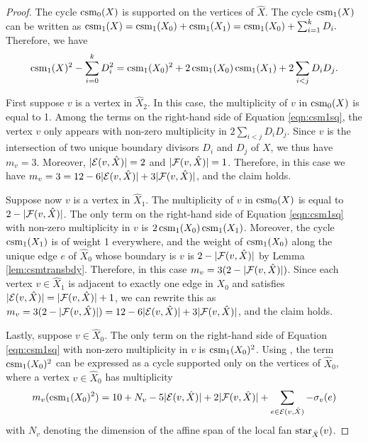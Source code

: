 \begin{proof}
The cycle $\operatorname{csm}_0(X)$ is supported on the vertices of $\hat{X}$. 
The cycle $\operatorname{csm}_1(X)$ can be written as 
$\operatorname{csm}_1(X) = \operatorname{csm}_1(X_0) + \operatorname{csm}_1(X_1) = \operatorname{csm}_1(X_0) + \sum_{i=1}^k D_i.$ 
Therefore, we have 
\begin{equation}\label{eqn:csm1sq}
\operatorname{csm}_1(X)^2 -  \sum_{i=0}^k D_i^2 = \operatorname{csm}_1(X_0)^2 + 2 \operatorname{csm}_1(X_0) \operatorname{csm}_1(X_1)  + 2\sum_{i < j} D_i D_j. 
\end{equation}

First suppose $v$ is a vertex in $\hat{X}_2$. 
In this case, the multiplicity of $v$ in $\operatorname{csm}_0(X)$ is equal to 1. 
Among the terms on the right-hand side of Equation \eqref{eqn:csm1sq}, the vertex  $v$ only appears with non-zero multiplicity in $2\sum_{i < j} D_i D_j$. Since $v$ is the intersection of two unique boundary divisors $D_i$ and $D_j$ of $X$, we thus have 
$m_v = 3$. 
Moreover, $|{{\mathcal E}}(v, \hat{X})| = 2$  and $|{{\mathcal F}}(v, \hat{X})|  = 1$. Therefore, in this case we have 
$m_v = 3 = 12 - 6|{{\mathcal E}}(v, \hat{X})| + 3|{{\mathcal F}}(v, \hat{X})|$,
and the claim holds.

Suppose now $v$ is a vertex in $\hat{X}_1$. The multiplicity of $v$ in $\operatorname{csm}_0(X)$
is equal to $2 - |{{\mathcal F}}(v, \hat{X})|$.
The only term on the right-hand side of 
Equation \eqref{eqn:csm1sq} with non-zero multiplicity in $v$ is $2 \operatorname{csm}_1(X_0) \operatorname{csm}_1(X_1)$. Moreover, the cycle  $ \operatorname{csm}_1(X_1)$ is of weight 1 everywhere, and the weight of $ \operatorname{csm}_1(X_0)$ along the unique edge $e$ of $\hat{X}_0$ whose boundary is $v$  is
$2 - |{{\mathcal F}}(v, \hat{X})|$ by Lemma \ref{lem:csmtransbdy}.  
Therefore, in this case $m_v = 3(2 - |{{\mathcal F}}(v, \hat{X})|)$.
Since each vertex $v \in \hat{X}_1$ is adjacent to exactly one edge in $X_0$ and satisfies $|{{\mathcal E}}(v,\hat{X})| = |{{\mathcal F}}(v,\hat{X})| + 1$, we can rewrite this as 
$m_v = 3(2 - |{{\mathcal F}}(v, \hat{X})|) = 12 -6|{{\mathcal E}}(v,\hat{X})| + 3|{{\mathcal F}}(v,\hat{X})|$,
and the claim holds.

Lastly, suppose $v \in \hat{X}_0$. The only term on the right-hand side of Equation \eqref{eqn:csm1sq} with non-zero multiplicity in $v$ is
$\operatorname{csm}_1(X_0)^2$. 
Using \cite[Proposition 3.18]{Shaw:Surf}, the term $\operatorname{csm}_1(X_0)^2$ can be expressed as a cycle supported only on the vertices of $\hat X_0$, where a vertex $v \in \hat X_0$ has multiplicity
\begin{equation*}
m_v(\operatorname{csm}_1(X_0)^2) = 10 + N_v - 5|{{\mathcal E}}(v, \hat{X})| + 2|{{\mathcal F}}(v, \hat{X}) | + \sum_{ e \in {{\mathcal E}}(v, \hat{X})} -\sigma_v(e)
\end{equation*}
with $N_v$ denoting the dimension of the affine span of the local fan $\operatorname{star}_{\hat X}(v)$.


\end{proof}
